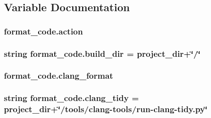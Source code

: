 \subsection{Variable Documentation}
\subsubsection[{\texorpdfstring{action}{action}}]{\setlength{\rightskip}{0pt plus 5cm}format\+\_\+code.\+action}\hypertarget{namespaceformat__code_a0ca88637d05517714f891209306691f8}{}\label{namespaceformat__code_a0ca88637d05517714f891209306691f8}
\subsubsection[{\texorpdfstring{build\+\_\+dir}{build_dir}}]{\setlength{\rightskip}{0pt plus 5cm}string format\+\_\+code.\+build\+\_\+dir = {\bf project\+\_\+dir}+\char`\"{}/\char`\"{}}\hypertarget{namespaceformat__code_a19bf4f28a88a3baab38d399765075e36}{}\label{namespaceformat__code_a19bf4f28a88a3baab38d399765075e36}
\subsubsection[{\texorpdfstring{clang\+\_\+format}{clang_format}}]{\setlength{\rightskip}{0pt plus 5cm}format\+\_\+code.\+clang\+\_\+format}\hypertarget{namespaceformat__code_a2064cdd8d02733f15b4d345bbb489a8d}{}\label{namespaceformat__code_a2064cdd8d02733f15b4d345bbb489a8d}
\subsubsection[{\texorpdfstring{clang\+\_\+tidy}{clang_tidy}}]{\setlength{\rightskip}{0pt plus 5cm}string format\+\_\+code.\+clang\+\_\+tidy = {\bf project\+\_\+dir}+\char`\"{}/tools/clang-\/tools/run-\/clang-\/tidy.\+py\char`\"{}}\hypertarget{namespaceformat__code_af7d6abd2c31bd839896ae3ca08e85449}{}\label{namespaceformat__code_af7d6abd2c31bd839896ae3ca08e85449}
